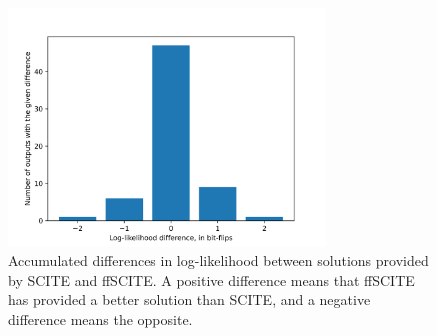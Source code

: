 \begin{figure}
    \centering
    \includegraphics[width=0.75\textwidth]{figures/likelihood_differences.png}
    \caption{Accumulated differences in log-likelihood between solutions provided by \ac{SCITE} and \ac{ffSCITE}. A positive difference means that \ac{ffSCITE} has provided a better solution than \ac{SCITE}, and a negative difference means the opposite.}
    \label{fig:likelihood_differences}
\end{figure}